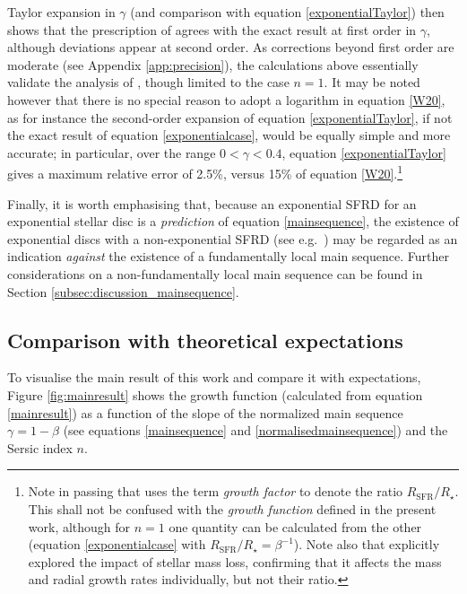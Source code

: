 \documentclass[fleqn,usenatbib]{mnras}
\begin{document}
Taylor expansion in $\gamma$ (and comparison with equation \ref{exponentialTaylor}) then shows that the prescription of \cite{Wilman+20} agrees with the exact result at first order in $\gamma$, although deviations appear at second order. As corrections beyond first order are moderate (see Appendix \ref{app:precision}), the calculations above essentially validate the analysis of \cite{Wilman+20}, though limited to the case $n=1$. It may be noted however that there is no special reason to adopt a logarithm in equation \eqref{W20}, as for instance the second-order expansion of equation \eqref{exponentialTaylor}, if not the exact result of equation \eqref{exponentialcase}, would be equally simple and more accurate; in particular, over the range $0 < \gamma < 0.4$, equation \eqref{exponentialTaylor} gives a maximum relative error of 2.5\%, versus 15\% of equation \eqref{W20}.\footnote{Note in passing that \cite{Wilman+20} uses the term \emph{growth factor} to denote the ratio $R_\textrm{SFR}/R_\star$. This shall not be confused with the \emph{growth function} defined in the present work, although for $n=1$ one quantity can be calculated from the other (equation \ref{exponentialcase} with $R_\textrm{SFR}/R_\star = \beta^{-1}$). Note also that \cite{Wilman+20} explicitly explored the impact of stellar mass loss, confirming that it affects the mass and radial growth rates individually, but not their ratio.}

Finally, it is worth emphasising that, because an exponential SFRD for an exponential stellar disc is a \emph{prediction} of equation \eqref{mainsequence}, the existence of exponential discs with a non-exponential SFRD (see e.g.\ \citealt{P+15}) may be regarded as an indication \emph{against} the existence of a fundamentally local main sequence. Further considerations on a non-fundamentally local main sequence can be found in Section \ref{subsec:discussion_mainsequence}.


\subsection{Comparison with theoretical expectations}\label{subsec:implications}

To visualise the main result of this work and compare it with expectations, Figure \ref{fig:mainresult} shows the growth function (calculated from equation \ref{mainresult}) as a function of the slope of the normalized main sequence $\gamma = 1-\beta$ (see equations \ref{mainsequence} and \ref{normalisedmainsequence}) and the Sersic index $n$.
\end{document}

